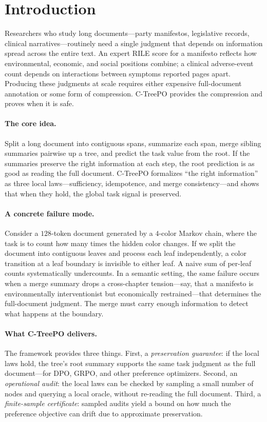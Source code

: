 \section{Introduction}\label{sec:introduction}

Researchers who study long documents---party manifestos, legislative records, clinical narratives---routinely need a single judgment that depends on information spread across the entire text. An expert RILE score for a manifesto reflects how environmental, economic, and social positions combine; a clinical adverse-event count depends on interactions between symptoms reported pages apart. Producing these judgments at scale requires either expensive full-document annotation or some form of compression. C-TreePO provides the compression and proves when it is safe.

\paragraph{The core idea.}
Split a long document into contiguous spans, summarize each span, merge sibling summaries pairwise up a tree, and predict the task value from the root. If the summaries preserve the right information at each step, the root prediction is as good as reading the full document. C-TreePO formalizes ``the right information'' as three local laws---sufficiency, idempotence, and merge consistency---and shows that when they hold, the global task signal is preserved.

\paragraph{A concrete failure mode.}
Consider a $128$-token document generated by a $4$-color Markov chain, where the task is to count how many times the hidden color changes. If we split the document into contiguous leaves and process each leaf independently, a color transition at a leaf boundary is invisible to either leaf. A naive sum of per-leaf counts systematically undercounts. In a semantic setting, the same failure occurs when a merge summary drops a cross-chapter tension---say, that a manifesto is environmentally interventionist but economically restrained---that determines the full-document judgment. The merge must carry enough information to detect what happens at the boundary.

\paragraph{What C-TreePO delivers.}
The framework provides three things. First, a \emph{preservation guarantee}: if the local laws hold, the tree's root summary supports the same task judgment as the full document---for DPO, GRPO, and other preference optimizers. Second, an \emph{operational audit}: the local laws can be checked by sampling a small number of nodes and querying a local oracle, without re-reading the full document. Third, a \emph{finite-sample certificate}: sampled audits yield a bound on how much the preference objective can drift due to approximate preservation.

